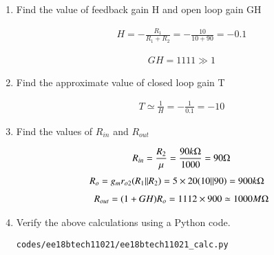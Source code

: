 \begin{enumerate}[label=\thesubsection.\arabic*.,ref=\thesubsection.\theenumi]
\item
Find the value of feedback gain H and open loop gain GH

\solution
\begin{align}
    H=-\frac{R_{1}}{R_{1}+R_{2}}=-\frac{10}{10+90}=-0.1
\end{align}

\begin{align}
    GH=1111 \gg 1
\end{align}

\item
Find the approximate value of closed loop gain T

\solution
\begin{align}
    T \simeq \frac{1}{H} = -\frac{1}{0.1} = -10
\end{align}

\item
Find the values of $R_{in}$ and $R_{out}$

\solution
\begin{align}
    R_{in}=\frac{R_{2}}{\mu}=\frac{90k\ohm}{1000}=90\ohm
\end{align}
\begin{align}
    R_{o} &=g_{m} r_{o 2}(R_{1} \| R_{2}) =5 \times 20(10 \| 90)=900k\ohm
\end{align}
\begin{align}
    R_{out}=(1+GH) R_{o}=1112 \times 900 \simeq 1000M\ohm
\end{align}

\begin{table}[!ht]
\centering

\caption{}
\label{table: Output_Table}
\end{table}

\item
Verify the above calculations using a Python code.

\solution
\begin{lstlisting}
codes/ee18btech11021/ee18btech11021_calc.py
\end{lstlisting}

\end{enumerate}
